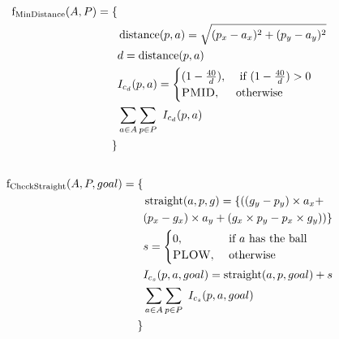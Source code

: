 \documentclass[a0,portrait]{sciposter}
\newcommand{\tituloB}[1]{\emph{\textbf{\color{blue}{#1}}}}
\begin{document}
\begin{multicols}{3}
\subsection*{\tituloB{Minimum distance}}

    \[
    \begin{aligned}
        \operatorname{f_{MinDistance}}(A, P) = \{\\
        & \operatorname{distance}(p,a) = \sqrt{ (p_x-a_x)^2  + (p_y - a_y)^2}\\
        & d = \operatorname{distance}(p,a) \\
        & I_{c_{d}}(p,a) = \begin{cases}
        (1-\frac{40}{d}), & \text{ if } (1-\frac{40}{d}) >0  \\ 
        \mathop{\text{\textsc{PMID}}}, & \text{otherwise} 
        \end{cases}
        \\
        & \sum_{a \in A} \sum_{p \in P} \ I_{c_{d}}(p,a) \\ \}
    \end{aligned}
    \]


\subsection*{\tituloB{Blocking the view of points of interest}}

    \[
    \begin{aligned}
        \operatorname{f_{CheckStraight}} (A, P, goal)= \{ \\
        &\operatorname{straight}(a,p,g) = \{ ((g_y - p_y) \times a_x + \\ 
        & (p_x - g_x) \times a_y + (g_x \times p_y - p_x \times g_y)) \}
        \\
        & s = \begin{cases}
        0, & \text{ if } a \ \text{has the ball} \\ 
        \mathop{\text{\textsc{PLOW}}}, & \text{ otherwise }
        \end{cases}
        \\
        & I_{c_{s}}(p,a,goal) = \operatorname{straight}(a,p,goal) + s
        \\
        & \sum_{a \in A} \sum_{p \in P} \ I_{c_{s}}(p,a,goal) \\
        \}
    \end{aligned}
    \]

\subsection*{\tituloB{Blocking the view of the goal}}


\end{multicols}
\end{document}
